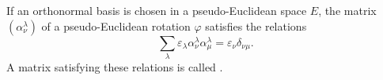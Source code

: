 If an orthonormal basis is chosen in a pseudo-Euclidean space $E$, the matrix $(\alpha_{\nu}^{\lambda})$ of a pseudo-Euclidean rotation $\varphi$ satisfies the relations
$$\sum_{\lambda} \varepsilon_{\lambda} \alpha_{\nu}^{\lambda} \alpha_{\mu}^{\lambda} = \varepsilon_{\nu} \delta_{\nu \mu}.$$
A matrix satisfying these relations is called .
